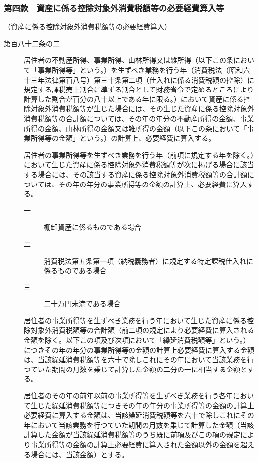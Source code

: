 \documentclass[twocolumn,a4j,10pt]{ltjtarticle}
\begin{document}
\subsubsection*{第四款　資産に係る控除対象外消費税額等の必要経費算入等}
\noindent\hspace{10pt}（資産に係る控除対象外消費税額等の必要経費算入）
\begin{description}
\item[第百八十二条の二]居住者の不動産所得、事業所得、山林所得又は雑所得（以下この条において「事業所得等」という。）を生ずべき業務を行う年（消費税法（昭和六十三年法律第百八号）第三十条第二項（仕入れに係る消費税額の控除）に規定する課税売上割合に準ずる割合として財務省令で定めるところにより計算した割合が百分の八十以上である年に限る。）において資産に係る控除対象外消費税額等が生じた場合には、その生じた資産に係る控除対象外消費税額等の合計額については、その年の年分の不動産所得の金額、事業所得の金額、山林所得の金額又は雑所得の金額（以下この条において「事業所得等の金額」という。）の計算上、必要経費に算入する。
\item[]居住者の事業所得等を生ずべき業務を行う年（前項に規定する年を除く。）において生じた資産に係る控除対象外消費税額等が次に掲げる場合に該当する場合には、その該当する資産に係る控除対象外消費税額等の合計額については、その年の年分の事業所得等の金額の計算上、必要経費に算入する。
\begin{description}
\item[一]棚卸資産に係るものである場合
\item[二]消費税法第五条第一項（納税義務者）に規定する特定課税仕入れに係るものである場合
\item[三]二十万円未満である場合
\end{description}
\item[]居住者の事業所得等を生ずべき業務を行う年において生じた資産に係る控除対象外消費税額等の合計額（前二項の規定により必要経費に算入される金額を除く。以下この項及び次項において「繰延消費税額等」という。）につきその年の年分の事業所得等の金額の計算上必要経費に算入する金額は、当該繰延消費税額等を六十で除しこれにその年において当該業務を行つていた期間の月数を乗じて計算した金額の二分の一に相当する金額とする。
\item[]居住者のその年の前年以前の事業所得等を生ずべき業務を行う各年において生じた繰延消費税額等につきその年の年分の事業所得等の金額の計算上必要経費に算入する金額は、当該繰延消費税額等を六十で除しこれにその年において当該業務を行つていた期間の月数を乗じて計算した金額（当該計算した金額が当該繰延消費税額等のうち既に前項及びこの項の規定により事業所得等の金額の計算上必要経費に算入された金額以外の金額を超える場合には、当該金額）とする。

\end{description}
\end{document}
